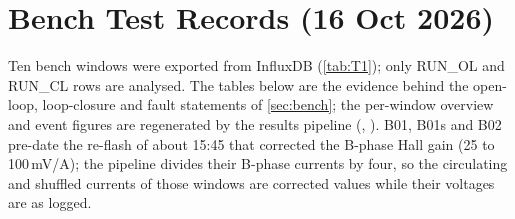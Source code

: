 \section{Bench Test Records (16 Oct 2026)}
\label{app:bench}
Ten bench windows were exported from InfluxDB (\cref{tab:T1}); only RUN\_OL and RUN\_CL rows are analysed. The tables below are the evidence behind the open-loop, loop-closure and fault statements of \cref{sec:bench}; the per-window overview and event figures are regenerated by the results pipeline (, ). B01, B01s and B02 pre-date the re-flash of about 15:45 that corrected the B-phase Hall gain (25 to 100\,mV/A); the pipeline divides their B-phase currents by four, so the circulating and shuffled currents of those windows are corrected values while their voltages are as logged.





